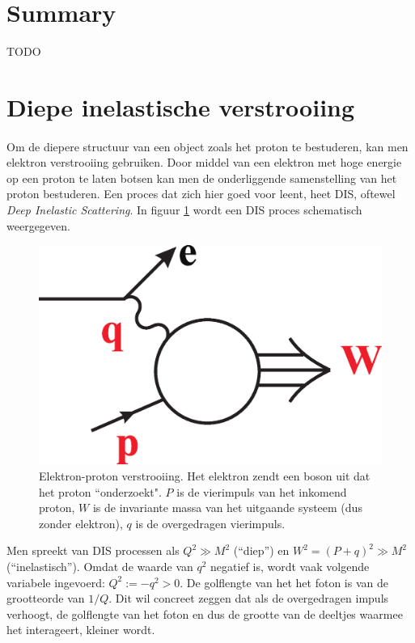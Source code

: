 \documentclass[a4paper,11pt]{article}
\numberwithin{equation}{section} %
\begin{document}
\section*{Summary}
TODO
\thispagestyle{empty}
\newpage

\tableofcontents
\thispagestyle{empty}
\newpage

\section{Diepe inelastische verstrooiing}
      \paragraph{}
Om de diepere structuur van een object zoals het proton te bestuderen, kan men elektron verstrooiing gebruiken.
Door middel van een elektron met hoge energie op een proton te laten botsen kan men de onderliggende samenstelling van het proton bestuderen.
Een proces dat zich hier goed voor leent, heet DIS, oftewel \textit{Deep Inelastic Scattering}. In figuur \ref{fig:DIS} wordt een DIS proces schematisch weergegeven.
\begin{figure} [H]
  \begin{center}
    \includegraphics[width=.33\textwidth]{Afbeeldingen/DIS.eps}
    \caption{Elektron-proton verstrooiing.
Het elektron zendt een boson uit dat het proton “onderzoekt".
$P$ is de vierimpuls van het inkomend proton, $W$ is de invariante massa van het uitgaande systeem (dus zonder elektron), $q$ is de overgedragen vierimpuls. \cite{Martin}}
   \label{fig:DIS}
  \end{center}
\end{figure}
 Men spreekt van DIS processen als $Q^2 \gg M^2$ (“diep”) en $W^2 = (P+q)^2 \gg M^2$ (“inelastisch”).
Omdat de waarde van $q^2$ negatief is, wordt vaak volgende variabele ingevoerd: $Q^2 :=-q^2 > 0$. De golflengte van het het foton is van de grootteorde van $1/Q$.
Dit wil concreet zeggen dat als de overgedragen impuls verhoogt, de golflengte van het foton en dus de grootte van de deeltjes waarmee het interageert, kleiner wordt.
\end{document}
